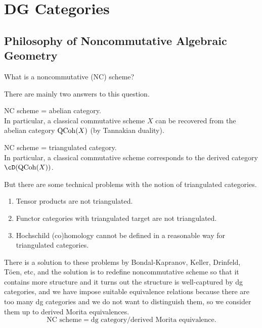 \chapter{DG Categories}

\section*{Philosophy of Noncommutative Algebraic Geometry}

\begin{ques}
What is a noncommutative (NC) scheme? 
\end{ques}

There are mainly two answers to this question. 

\begin{ans}
NC scheme = abelian category. \\ 
In particular, a classical commutative scheme $ X $ can be recovered from the abelian category $ \operatorname{QCoh}(X) $ (by Tannakian duality).
\end{ans}

\begin{ans}
NC scheme = triangulated category. \\
In particular, a classical commutative scheme corresponds to the derived category 
$ \cD(\QCoh(X)) $.
\end{ans}

But there are some technical problems with the notion of triangulated categories.
\begin{enumerate}
    \item Tensor products are not triangulated. 
    \item Functor categories with triangulated target are not triangulated. 
    \item Hochschild (co)homology cannot be defined in a reasonable way for triangulated categories.
\end{enumerate}

There is a solution to these problems by Bondal-Kapranov, Keller, Drinfeld, T\"{o}en, etc, and the solution is to redefine noncommutative scheme so that it contains more structure and it turns out the structure is well-captured by dg categories, and we have impose suitable equivalence relations because there are too many dg categories and we do not want to distinguish them, so we consider them up to derived Morita equivalences. 
\[ \text{NC scheme} = \text{dg category}/\text{derived Morita equivalence} . \]


